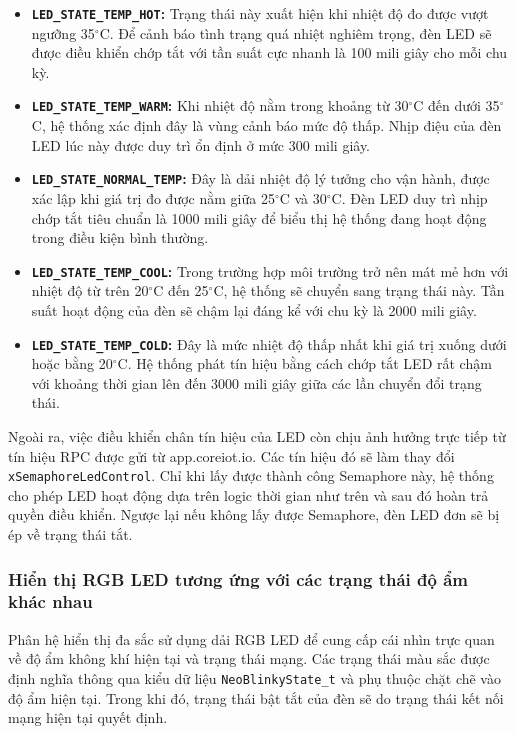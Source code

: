 \begin{itemize}
    \item \textbf{\texttt{LED\_STATE\_TEMP\_HOT}:} Trạng thái này xuất hiện khi nhiệt độ đo được vượt ngưỡng 35$^\circ$C. Để cảnh báo tình trạng quá nhiệt nghiêm trọng, đèn LED sẽ được điều khiển chớp tắt với tần suất cực nhanh là 100 mili giây cho mỗi chu kỳ.
    \item \textbf{\texttt{LED\_STATE\_TEMP\_WARM}:} Khi nhiệt độ nằm trong khoảng từ 30$^\circ$C đến dưới 35$^\circ$C, hệ thống xác định đây là vùng cảnh báo mức độ thấp. Nhịp điệu của đèn LED lúc này được duy trì ổn định ở mức 300 mili giây.
    \item \textbf{\texttt{LED\_STATE\_NORMAL\_TEMP}:} Đây là dải nhiệt độ lý tưởng cho vận hành, được xác lập khi giá trị đo được nằm giữa 25$^\circ$C và 30$^\circ$C. Đèn LED duy trì nhịp chớp tắt tiêu chuẩn là 1000 mili giây để biểu thị hệ thống đang hoạt động trong điều kiện bình thường.
    \item \textbf{\texttt{LED\_STATE\_TEMP\_COOL}:} Trong trường hợp môi trường trở nên mát mẻ hơn với nhiệt độ từ trên 20$^\circ$C đến 25$^\circ$C, hệ thống sẽ chuyển sang trạng thái này. Tần suất hoạt động của đèn sẽ chậm lại đáng kể với chu kỳ là 2000 mili giây.
    \item \textbf{\texttt{LED\_STATE\_TEMP\_COLD}:} Đây là mức nhiệt độ thấp nhất khi giá trị xuống dưới hoặc bằng 20$^\circ$C. Hệ thống phát tín hiệu bằng cách chớp tắt LED rất chậm với khoảng thời gian lên đến 3000 mili giây giữa các lần chuyển đổi trạng thái.
\end{itemize}

Ngoài ra, việc điều khiển chân tín hiệu của LED còn chịu ảnh hưởng trực tiếp từ tín hiệu RPC được gửi từ app.coreiot.io. Các tín hiệu đó sẽ làm thay đổi \texttt{xSemaphoreLedControl}. Chỉ khi lấy được thành công Semaphore này, hệ thống cho phép LED hoạt động dựa trên logic thời gian như trên và sau đó hoàn trả quyền điều khiển. Ngược lại nếu không lấy được Semaphore, đèn LED đơn sẽ bị ép về trạng thái tắt.

\subsubsection{Hiển thị RGB LED tương ứng với các trạng thái độ ẩm khác nhau}
Phân hệ hiển thị đa sắc sử dụng dải RGB LED để cung cấp cái nhìn trực quan về độ ẩm không khí hiện tại và trạng thái mạng. Các trạng thái màu sắc được định nghĩa thông qua kiểu dữ liệu \texttt{NeoBlinkyState\_t} và phụ thuộc chặt chẽ vào độ ẩm hiện tại. Trong khi đó, trạng thái bật tắt của đèn sẽ do trạng thái kết nối mạng hiện tại quyết định.


